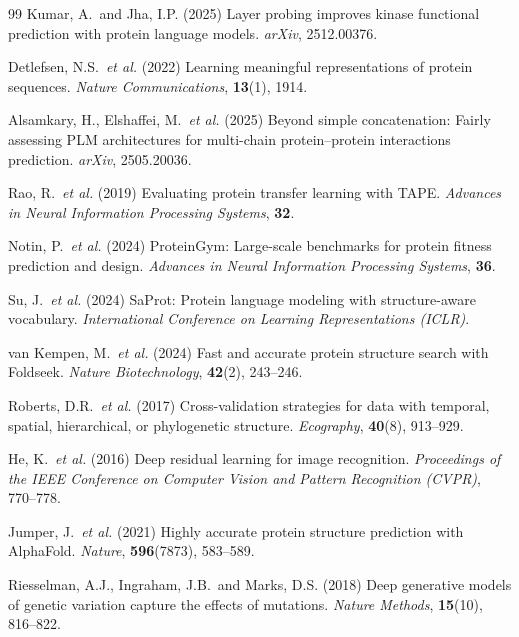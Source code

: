 \documentclass[11pt,a4paper]{article}
\begin{document}
\begin{thebibliography}{99}
Kumar, A.\ and Jha, I.P. (2025)
Layer probing improves kinase functional prediction with protein language models.
\textit{arXiv}, 2512.00376.

Detlefsen, N.S.\ \textit{et al.} (2022)
Learning meaningful representations of protein sequences.
\textit{Nature Communications}, \textbf{13}(1), 1914.

Alsamkary, H., Elshaffei, M.\ \textit{et al.} (2025)
Beyond simple concatenation: Fairly assessing PLM architectures for multi-chain
protein--protein interactions prediction.
\textit{arXiv}, 2505.20036.

Rao, R.\ \textit{et al.} (2019)
Evaluating protein transfer learning with TAPE.
\textit{Advances in Neural Information Processing Systems}, \textbf{32}.

Notin, P.\ \textit{et al.} (2024)
ProteinGym: Large-scale benchmarks for protein fitness prediction and design.
\textit{Advances in Neural Information Processing Systems}, \textbf{36}.

Su, J.\ \textit{et al.} (2024)
SaProt: Protein language modeling with structure-aware vocabulary.
\textit{International Conference on Learning Representations (ICLR)}.

van Kempen, M.\ \textit{et al.} (2024)
Fast and accurate protein structure search with Foldseek.
\textit{Nature Biotechnology}, \textbf{42}(2), 243--246.

Roberts, D.R.\ \textit{et al.} (2017)
Cross-validation strategies for data with temporal, spatial, hierarchical, or
phylogenetic structure.
\textit{Ecography}, \textbf{40}(8), 913--929.

He, K.\ \textit{et al.} (2016)
Deep residual learning for image recognition.
\textit{Proceedings of the IEEE Conference on Computer Vision and Pattern Recognition (CVPR)},
770--778.

Jumper, J.\ \textit{et al.} (2021)
Highly accurate protein structure prediction with AlphaFold.
\textit{Nature}, \textbf{596}(7873), 583--589.

Riesselman, A.J., Ingraham, J.B.\ and Marks, D.S. (2018)
Deep generative models of genetic variation capture the effects of mutations.
\textit{Nature Methods}, \textbf{15}(10), 816--822.


\end{thebibliography}
\end{document}
